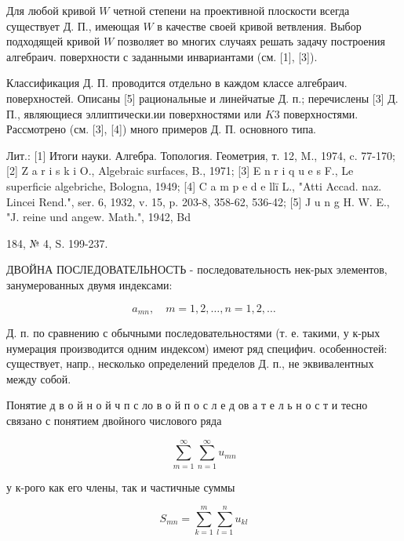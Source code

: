\documentclass[10pt]{article}
\begin{document}
Для любой кривой $W$ четной степени на проективной плоскости всегда существует Д. П., имеющая $W$ в качестве своей кривой ветвления. Выбор подходящей кривой $W$ позволяет во многих случаях решать задачу построения алгебраич. поверхности с заданными инвариантами (см. [1], [3]).



Классификация Д. П. проводится отдельно в каждом классе алгебраич. поверхностей. Описаны [5] рациональные и линейчатые Д. п.; перечислены [3] Д. П., являющиеся эллиптически.ии поверхностями или $K 3$ поверхностями. Рассмотрено (см. [3], [4]) много примеров Д. П. основного типа.



Лит.: [1] Итоги науки. Алгебра. Топология. Геометрия, т. 12, M., 1974, c. 77-170; [2] Z a r i s k i O., Algebraic surfaces, B., 1971; [3] E n r i q u e s F., Le superficie algebriche, Bologna, 1949; [4] C a m p e d e llï L., "Atti Accad. naz. Lincei Rend.", ser. 6, 1932, v. 15, p. 203-8, 358-62, 536-42; [5] J u n g H. W. E., "J. reine und angew. Math.", 1942, Bd

184, № 4, S. 199-237.



ДВОЙНА ПОСЛЕДОВАТЕЛЬНОСТЬ - последовательность нек-рых элементов, занумерованных двумя индексами:



\[

a_{m n}, \quad m=1,2, \ldots, n=1,2, \ldots

\]



Д. п. по сравнению с обычными последовательностями (т. е. такими, у к-рых нумерация производится одним индексом) имеют ряд специфич. особенностей: существует, напр., несколько определений пределов Д. п., не эквивалентных между собой.



Понятие д в о й н о й ч п с ло в о й п о с л е д ов а т е л ь н о с т и тесно связано с понятием двойного числового ряда



\[

\sum_{m=1}^{\infty} \sum_{n=1}^{\infty} u_{m n}

\]



у к-рого как его члены, так и частичные суммы



\[

S_{m n}=\sum_{k=1}^{m} \sum_{l=1}^{n} u_{k l}

\]
\end{document}
